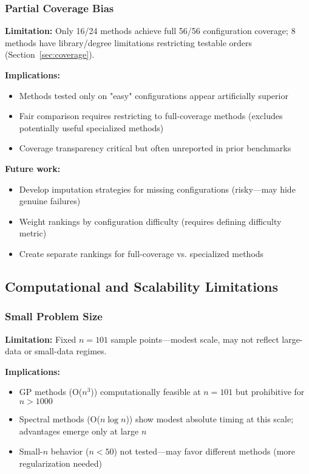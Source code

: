 \subsubsection{Partial Coverage Bias}

\textbf{Limitation:} Only 16/24 methods achieve full 56/56 configuration coverage; 8 methods have library/degree limitations restricting testable orders (Section~\ref{sec:coverage}).

\textbf{Implications:}
\begin{itemize}
    \item Methods tested only on "easy" configurations appear artificially superior
    \item Fair comparison requires restricting to full-coverage methods (excludes potentially useful specialized methods)
    \item Coverage transparency critical but often unreported in prior benchmarks
\end{itemize}

\textbf{Future work:}
\begin{itemize}
    \item Develop imputation strategies for missing configurations (risky—may hide genuine failures)
    \item Weight rankings by configuration difficulty (requires defining difficulty metric)
    \item Create separate rankings for full-coverage vs. specialized methods
\end{itemize}

\subsection{Computational and Scalability Limitations}

\subsubsection{Small Problem Size}

\textbf{Limitation:} Fixed $n=101$ sample points—modest scale, may not reflect large-data or small-data regimes.

\textbf{Implications:}
\begin{itemize}
    \item GP methods (O($n^3$)) computationally feasible at $n=101$ but prohibitive for $n > 1000$
    \item Spectral methods (O($n \log n$)) show modest absolute timing at this scale; advantages emerge only at large $n$
    \item Small-$n$ behavior ($n < 50$) not tested—may favor different methods (more regularization needed)
\end{itemize}

